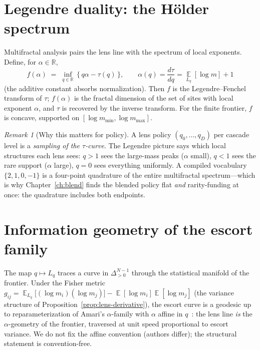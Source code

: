 \documentclass[12pt,oneside]{report}
\theoremstyle{plain}
\theoremstyle{definition}
\theoremstyle{remark}
\newtheorem{remarkx}[theorem]{Remark}
\newcommand{\R}{\mathbb{R}}
\newcommand{\simplex}{\Delta}
\newcommand{\E}{\operatorname*{\mathbb{E}}}
\newcommand{\escort}[1]{L_{#1}}
\begin{document}
\section{Legendre duality: the H\"older spectrum}

Multifractal analysis pairs the lens line with the spectrum of local
exponents. Define, for $\alpha\in\R$,
\begin{equation}
f(\alpha) \;=\; \inf_{q\in\R}\,\bigl\{\, q\alpha - \tau(q) \,\bigr\},
\qquad \alpha(q) = \frac{d\tau}{dq} = \E_{\escort{q}}[\log m] + 1
\end{equation}
(the additive constant absorbs normalization). Then $f$ is the Legendre--Fenchel
transform of $\tau$; $f(\alpha)$ is the fractal dimension of the set of
sites with local exponent $\alpha$, and $\tau$ is recovered by the
inverse transform. For the finite frontier, $f$ is concave, supported
on $[\log m_{\min},\log m_{\max}]$.

\begin{remarkx}[Why this matters for policy]
A lens policy $(q_0,\dots,q_D)$ per cascade level is a \emph{sampling
of the $\tau$-curve}. The Legendre picture says which local structures
each lens sees: $q>1$ sees the large-mass peaks ($\alpha$ small), $q<1$
sees the rare support ($\alpha$ large), $q=0$ sees everything
uniformly. A compiled vocabulary $\{2,1,0,-1\}$ is a four-point
quadrature of the entire multifractal spectrum---which is why
Chapter~\ref{ch:blend} finds the blended policy flat \emph{and}
rarity-funding at once: the quadrature includes both endpoints.
\end{remarkx}

\section{Information geometry of the escort family}
\label{sec:alpha-geometry}

The map $q\mapsto\escort{q}$ traces a curve in
$\simplex^{N-1}_{>0}$ through the statistical manifold of the frontier.
Under the Fisher metric
$g_{ij}=\E_{\escort{q}}\bigl[(\log m_i)(\log m_j)\bigr]-\E[\log
m_i]\E[\log m_j]$ (the variance structure of
Proposition~\ref{prop:lens-derivative}), the escort curve is a
geodesic up to reparameterization of Amari's
$\alpha$-family with $\alpha$ affine in $q$~\cite{amari2000,tsallis1988}:
the lens line \emph{is} the $\alpha$-geometry of the frontier,
traversed at unit speed proportional to escort variance. We do not fix
the affine convention (authors differ); the structural statement is
convention-free.
\end{document}
